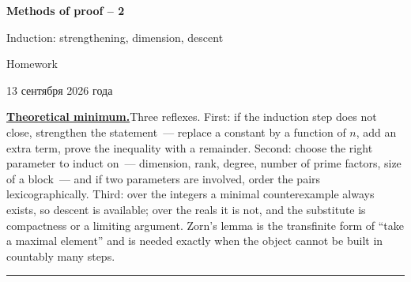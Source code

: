 \documentclass[11pt,a4paper]{article}
\begin{document}
\begin{center}
{\huge\bfseries Methods of proof -- 2\par}\vspace{0.8em}
{\Large Induction: strengthening, dimension, descent\par}\vspace{0.8em}
{\Large Homework\par}\vspace{0.8em}
{\foreignlanguage{russian}{13 сентября 2026 года}\par}
\end{center}\vspace{-3.3pt}

\noindent\textbf{\underline{Theoretical minimum.}}\quad Three reflexes. First: if the induction
step does not close, strengthen the statement~--- replace a constant by a function of $n$, add an
extra term, prove the inequality with a remainder. Second: choose the right parameter to induct
on~--- dimension, rank, degree, number of prime factors, size of a block~--- and if two parameters
are involved, order the pairs lexicographically. Third: over the integers a minimal counterexample
always exists, so descent is available; over the reals it is not, and the substitute is
compactness or a limiting argument. Zorn's lemma is the transfinite form of ``take a maximal
element'' and is needed exactly when the object cannot be built in countably many steps.

\medskip
\noindent\rule{\textwidth}{0.4pt}
\end{document}

